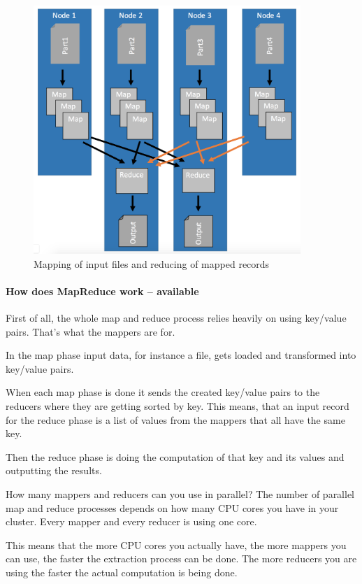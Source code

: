 \documentclass[12pt]{scrartcl} %
\begin{document}
\begin{figure}[htbp] 
  \centering
     \includegraphics[width=0.9\textwidth]{images/MapReduce-Process-Detailed}
  \caption{Mapping of input files and reducing of mapped records}
  \label{fig:Bild1}
\end{figure}

\paragraph{How does MapReduce work -- available}

First of all, the whole map and reduce process relies heavily on using key/value pairs. That’s what the mappers are for.

In the map phase input data, for instance a file, gets loaded and transformed into key/value pairs.

When each map phase is done it sends the created key/value pairs to the reducers where they are getting sorted by key. This means, that an input record for the reduce phase is a list of values from the mappers that all have the same key.

Then the reduce phase is doing the computation of that key and its values and outputting the results.

How many mappers and reducers can you use in parallel? The number of parallel map and reduce processes depends on how many CPU cores you have in your cluster. Every mapper and every reducer is using one core.

This means that the more CPU cores you actually have, the more mappers you can use, the faster the extraction process can be done. The more reducers you are using the faster the actual computation is being done.
\end{document}
